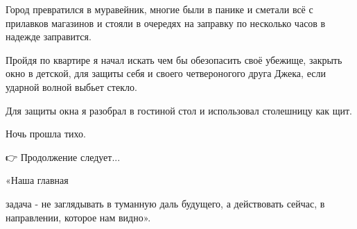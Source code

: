 Город превратился в муравейник, многие были в панике и сметали всё с прилавков
магазинов и стояли в очередях на заправку по несколько часов в надежде
заправится.

Пройдя по квартире я начал искать чем бы обезопасить своё убежище, закрыть окно
в детской, для защиты себя  и своего четвероногого друга Джека, если ударной
волной выбьет стекло.

Для защиты окна я разобрал в гостиной стол и использовал столешницу как щит.

Ночь прошла тихо. 

👉 Продолжение следует...

«Наша главная 

задача - не заглядывать в туманную даль будущего, а действовать сейчас, в
направлении, которое нам видно».

